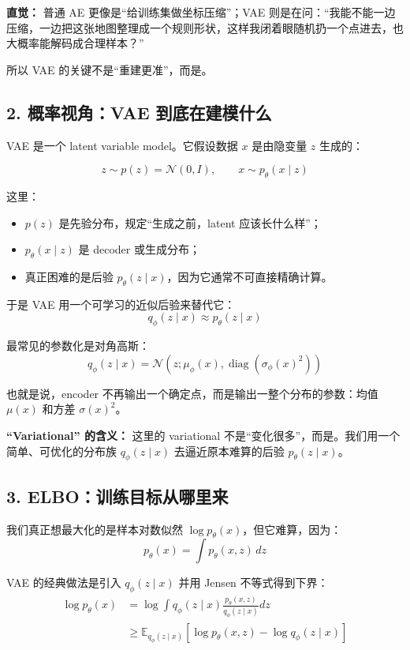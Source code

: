\begin{intubox}
\textbf{直觉：} 普通 AE 更像是“给训练集做坐标压缩”；VAE 则是在问：“我能不能一边压缩，一边把这张地图整理成一个规则形状，这样我闭着眼随机扔一个点进去，也大概率能解码成合理样本？”
\end{intubox}

所以 VAE 的关键不是“重建更准”，而是。

\subsection{2. 概率视角：VAE 到底在建模什么}

VAE 是一个 latent variable model。它假设数据 $x$ 是由隐变量 $z$ 生成的：

\[
z \sim p(z)=\mathcal{N}(0,I), \qquad x \sim p_\theta(x\mid z)
\]

这里：

\begin{itemize}[leftmargin=1.5em]
  \item $p(z)$ 是先验分布，规定“生成之前，latent 应该长什么样”；
  \item $p_\theta(x\mid z)$ 是 decoder 或生成分布；
  \item 真正困难的是后验 $p_\theta(z\mid x)$，因为它通常不可直接精确计算。
\end{itemize}

于是 VAE 用一个可学习的近似后验来替代它：
\[
q_\phi(z\mid x) \approx p_\theta(z\mid x)
\]

最常见的参数化是对角高斯：
\[
q_\phi(z\mid x) = \mathcal{N}(z;\mu_\phi(x),\operatorname{diag}(\sigma_\phi(x)^2))
\]

也就是说，encoder 不再输出一个确定点，而是输出一整个分布的参数：均值 $\mu(x)$ 和方差 $\sigma(x)^2$。

\begin{conceptbox}
\textbf{“Variational” 的含义：} 这里的 variational 不是“变化很多”，而是。我们用一个简单、可优化的分布族 $q_\phi(z\mid x)$ 去逼近原本难算的后验 $p_\theta(z\mid x)$。
\end{conceptbox}

\subsection{3. ELBO：训练目标从哪里来}

我们真正想最大化的是样本对数似然 $\log p_\theta(x)$，但它难算，因为：
\[
p_\theta(x)=\int p_\theta(x,z)\,dz
\]

VAE 的经典做法是引入 $q_\phi(z\mid x)$ 并用 Jensen 不等式得到下界：
\[
\begin{aligned}
\log p_\theta(x)
&= \log \int q_\phi(z\mid x)\frac{p_\theta(x,z)}{q_\phi(z\mid x)}dz \\
&\geq \mathbb{E}_{q_\phi(z\mid x)}\left[\log p_\theta(x,z)-\log q_\phi(z\mid x)\right]
\end{aligned}
\]

